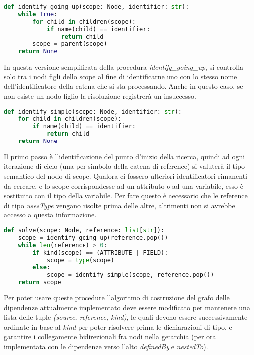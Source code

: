 \begin{lstlisting}[caption="Pseudocodice della procedura di ricerca senza limite superiore", language=Python]
def identify_going_up(scope: Node, identifier: str):
    while True:
        for child in children(scope):
            if name(child) == identifier:
                return child
        scope = parent(scope)
    return None
\end{lstlisting}

In questa versione semplificata della procedura \emph{identify\_going\_up}, si controlla solo tra i nodi figli dello scope al fine di identificarne uno con lo stesso nome dell'identificatore della catena che si sta processando. Anche in questo caso, se non esiste un nodo figlio la risoluzione registrer\`a un insuccesso.

\begin{lstlisting}[caption="Pseudocodice della procedura di ricerca con scope", language=Python]
def identify_simple(scope: Node, identifier: str):
    for child in children(scope):
        if name(child) == identifier:
            return child
    return None
\end{lstlisting}

Il primo passo \`e l'identificazione del punto d'inizio della ricerca, quindi ad ogni iterazione di ciclo (una per simbolo della catena di reference) si valuter\`a il tipo semantico del nodo di scope. Qualora ci fossero ulteriori identificatori rimanenti da cercare, e lo scope corrispondesse ad un attributo o ad una variabile, esso \`e sostituito con il tipo della variabile. Per fare questo \`e necessario che le reference di tipo \emph{usesType} vengano risolte prima delle altre, altrimenti non si avrebbe accesso a questa informazione.

\begin{lstlisting}[caption="Pseudocodice della procedura di risoluzione delle reference", language=Python]
def solve(scope: Node, reference: list[str]):
    scope = identify_going_up(reference.pop())
    while len(reference) > 0:
        if kind(scope) == (ATTRIBUTE | FIELD):
            scope = type(scope)
        else:
            scope = identify_simple(scope, reference.pop())
    return scope
\end{lstlisting}

Per poter usare queste procedure l'algoritmo di costruzione del grafo delle dipendenze attualmente implementato deve essere modificato per mantenere una lista delle tuple \emph{(source, reference, kind)}, le quali devono essere successivamente ordinate in base al \emph{kind} per poter risolvere prima le dichiarazioni di tipo, e garantire i collegamente bidirezionali fra nodi nella gerarchia (per ora implementata con le dipendenze verso l'alto \emph{definedBy} e \emph{nestedTo}).
